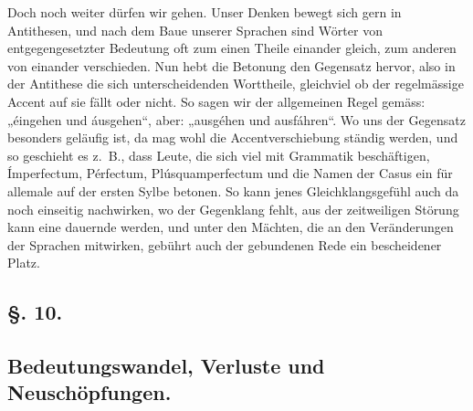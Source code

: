 {Doch noch weiter dürfen wir gehen. Unser Denken bewegt sich gern in Antithesen, und nach dem Baue unserer Sprachen sind Wörter von entgegengesetzter Bedeutung oft zum einen Theile einander gleich, zum anderen von einander verschieden. Nun hebt die Betonung den Gegensatz hervor, also in der Antithese die sich unterscheidenden Worttheile, gleichviel ob der regelmässige Accent auf sie fällt oder nicht. So sagen wir der allgemeinen Regel gemäss: „éingehen und áusgehen“, aber: „ausgéhen und ausfáhren“. Wo uns der Gegensatz besonders geläufig ist, da mag wohl die Accentverschiebung ständig werden, und so geschieht es z.~B., dass Leute, die sich viel mit Grammatik beschäftigen, Ímperfectum, Pérfectum, Plúsquamperfectum und die Namen der Casus ein für allemale auf der ersten Sylbe betonen. So kann jenes Gleichklangsgefühl auch da noch einseitig nachwirken, wo der Gegenklang fehlt, aus der zeitweiligen Störung kann eine dauernde werden, und unter den Mächten, die an den Veränderungen der Sprachen mitwirken, gebührt auch der gebundenen Rede ein bescheidener Platz.

\subsection*{§. 10.}\label{III.II.II.10}
\subsection*{Bedeutungswandel, Verluste und Neuschöpfungen.}
}
